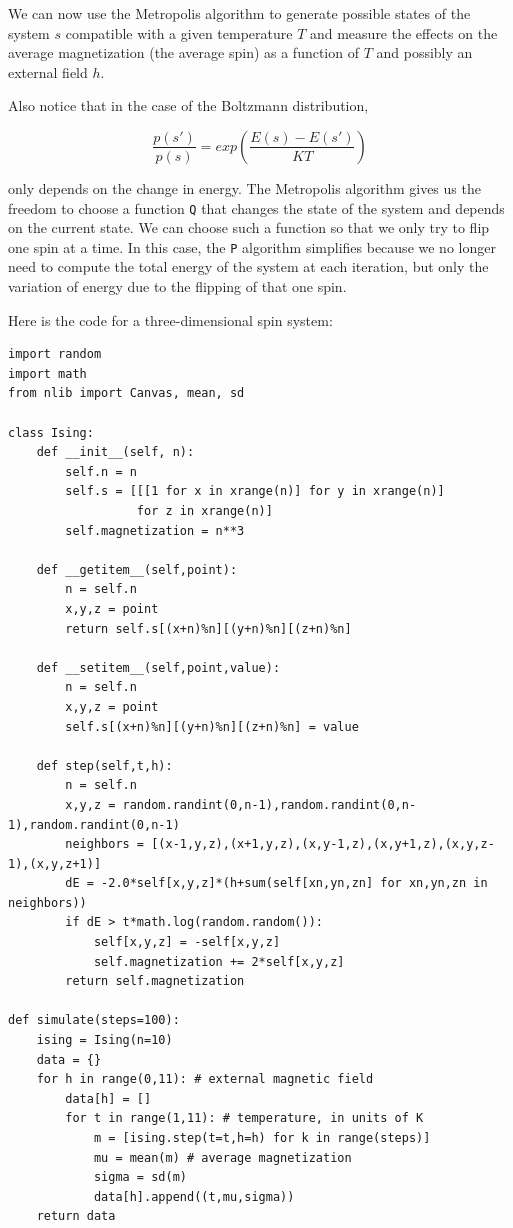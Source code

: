 \documentclass[justified,sixbynine]{tufte-book}
\def\ft{\small\tt}
\theoremstyle{plain}%
\theoremstyle{definition}
\theoremstyle{remark}
\begin{document}
\begin{fullwidth}
We can now use the Metropolis algorithm to generate possible states of the system $s$ compatible with a given temperature $T$ and measure the effects on the average magnetization (the average spin) as a function of $T$ and possibly an external field $h$.

Also notice that in the case of the Boltzmann distribution,

\begin{equation}
\frac{p(s')}{p(s)} = exp\left(\frac{E(s)-E(s')}{KT}\right)
\end{equation}

only depends on the change in energy. The Metropolis algorithm gives us the freedom to choose a function {\ft Q} that changes the state of the system and depends on the current state. We can choose such a function so that we only try to flip one spin at a time. In this case, the {\ft P} algorithm simplifies because we no longer need to compute the total energy of the system at each iteration, but only the variation of energy due to the flipping of that one spin.

Here is the code for a three-dimensional spin system:


\begin{lstlisting}[caption={in file: {\ft ising.py}}]
import random
import math
from nlib import Canvas, mean, sd

class Ising:
    def __init__(self, n):
        self.n = n
        self.s = [[[1 for x in xrange(n)] for y in xrange(n)]
                  for z in xrange(n)]
        self.magnetization = n**3

    def __getitem__(self,point):
        n = self.n
        x,y,z = point
        return self.s[(x+n)%n][(y+n)%n][(z+n)%n]

    def __setitem__(self,point,value):
        n = self.n
        x,y,z = point
        self.s[(x+n)%n][(y+n)%n][(z+n)%n] = value

    def step(self,t,h):
        n = self.n
        x,y,z = random.randint(0,n-1),random.randint(0,n-1),random.randint(0,n-1)
        neighbors = [(x-1,y,z),(x+1,y,z),(x,y-1,z),(x,y+1,z),(x,y,z-1),(x,y,z+1)]
        dE = -2.0*self[x,y,z]*(h+sum(self[xn,yn,zn] for xn,yn,zn in neighbors))
        if dE > t*math.log(random.random()):
            self[x,y,z] = -self[x,y,z]
            self.magnetization += 2*self[x,y,z]
        return self.magnetization

def simulate(steps=100):
    ising = Ising(n=10)
    data = {}
    for h in range(0,11): # external magnetic field
        data[h] = []
        for t in range(1,11): # temperature, in units of K
            m = [ising.step(t=t,h=h) for k in range(steps)]
            mu = mean(m) # average magnetization
            sigma = sd(m)
            data[h].append((t,mu,sigma))
    return data


\end{lstlisting}
\end{fullwidth}
\end{document}
